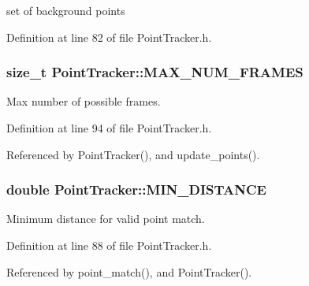 set of background points 



\-Definition at line 82 of file \-Point\-Tracker.\-h.

\hypertarget{class_point_tracker_acb445ed3b433172cb10172db77ed702a}{
\subsubsection[{\-M\-A\-X\-\_\-\-N\-U\-M\-\_\-\-F\-R\-A\-M\-E\-S}]{\setlength{\rightskip}{0pt plus 5cm}size\-\_\-t {\bf \-Point\-Tracker\-::\-M\-A\-X\-\_\-\-N\-U\-M\-\_\-\-F\-R\-A\-M\-E\-S}}}
\label{class_point_tracker_acb445ed3b433172cb10172db77ed702a}


\-Max number of possible frames. 



\-Definition at line 94 of file \-Point\-Tracker.\-h.



\-Referenced by \-Point\-Tracker(), and update\-\_\-points().

\hypertarget{class_point_tracker_a3cbc1fe8d39f2c8183654a67f914fa37}{
\subsubsection[{\-M\-I\-N\-\_\-\-D\-I\-S\-T\-A\-N\-C\-E}]{\setlength{\rightskip}{0pt plus 5cm}double {\bf \-Point\-Tracker\-::\-M\-I\-N\-\_\-\-D\-I\-S\-T\-A\-N\-C\-E}}}
\label{class_point_tracker_a3cbc1fe8d39f2c8183654a67f914fa37}


\-Minimum distance for valid point match. 



\-Definition at line 88 of file \-Point\-Tracker.\-h.



\-Referenced by point\-\_\-match(), and \-Point\-Tracker().

